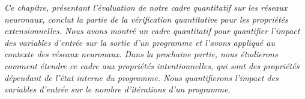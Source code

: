 \frenchdiv

\emph{Ce chapitre, présentant l'évaluation de notre cadre quantitatif sur les réseaux neuronaux, conclut la partie de la vérification quantitative pour les propriétés extensionnelles. Nous avons montré un cadre quantitatif pour quantifier l'impact des variables d'entrée sur la sortie d'un programme et l'avons appliqué au contexte des réseaux neuronaux. Dans la prochaine partie, nous étudierons comment étendre ce cadre aux propriétés intentionnelles, qui sont des propriétés dépendant de l'état interne du programme. Nous quantifierons l'impact des variables d'entrée sur le nombre d'itérations d'un programme.}
